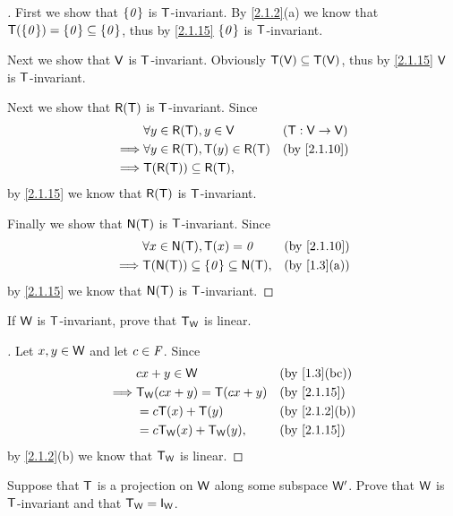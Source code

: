 \begin{proof}[]
	First we show that \(\left\lbrace\mathit{0}\right\rbrace\) is \(\mathsf{T}\)-invariant.
	By \cref{2.1.2}(a) we know that \(\mathsf{T}(\left\lbrace\mathit{0}\right\rbrace) = \left\lbrace\mathit{0}\right\rbrace \subseteq \left\lbrace\mathit{0}\right\rbrace\), thus by \cref{2.1.15} \(\left\lbrace\mathit{0}\right\rbrace\) is \(\mathsf{T}\)-invariant.

	Next we show that \(\mathsf{V}\) is \(\mathsf{T}\)-invariant.
	Obviously \(\mathsf{T}(\mathsf{V}) \subseteq \mathsf{T}(\mathsf{V})\), thus by \cref{2.1.15} \(\mathsf{V}\) is \(\mathsf{T}\)-invariant.

	Next we show that \(\rg{\T}\) is \(\mathsf{T}\)-invariant.
	Since
	\begin{align*}
		         & \forall y \in \rg{\T}, y \in \V          &  & (\T : \V \to \V) \\
		\implies & \forall y \in \rg{\T}, \T(y) \in \rg{\T} &  & \by{2.1.10}      \\
		\implies & \T(\rg{\T}) \subseteq \rg{\T},
	\end{align*}
	by \cref{2.1.15} we know that \(\rg{\T}\) is \(\mathsf{T}\)-invariant.

	Finally we show that \(\ns{\T}\) is \(\mathsf{T}\)-invariant.
	Since
	\begin{align*}
		         & \forall x \in \ns{\T}, \T(x) = \zv                 &  & \by{2.1.10} \\
		\implies & \T(\ns{\T}) \subseteq \set{\zv} \subseteq \ns{\T}, &  & \by{1.3}[a]
	\end{align*}
	by \cref{2.1.15} we know that \(\ns{\T}\) is \(\mathsf{T}\)-invariant.
\end{proof}

\begin{ex}\label{ex:2.1.29}
	If \(\mathsf{W}\) is \(\mathsf{T}\)-invariant, prove that \(\mathsf{T}_{\mathsf{W}}\) is linear.
\end{ex}

\begin{proof}[]
	Let \(x, y \in \mathsf{W}\) and let \(c \in \mathit{F}\).
	Since
	\begin{align*}
		         & cx + y \in \W                &  & \by{1.3}[bc]  \\
		\implies & \T_{\W}(cx + y) = \T(cx + y) &  & \by{2.1.15}   \\
		         & = c \T(x) + \T(y)            &  & \by{2.1.2}[b] \\
		         & = c \T_{\W}(x) + \T_{\W}(y), &  & \by{2.1.15}
	\end{align*}
	by \cref{2.1.2}(b) we know that \(\mathsf{T}_{\mathsf{W}}\) is linear.
\end{proof}

\begin{ex}\label{ex:2.1.30}
	Suppose that \(\mathsf{T}\) is a projection on \(\mathsf{W}\) along some subspace \(\mathsf{W}'\).
	Prove that \(\mathsf{W}\) is \(\mathsf{T}\)-invariant and that \(\T_{\W} = \IT[\W]\).
\end{ex}


